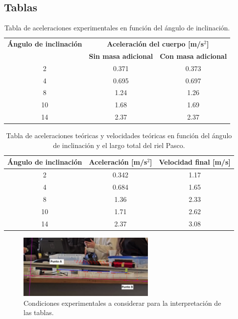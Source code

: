 \documentclass[twocolumn,12pt]{article}
\begin{document}
	

	\onecolumn
        \subsection{Tablas}
	\begin{table}[h!]
	\centering
	\begin{tabular}{|c|c|c|}
	\hline
	\textbf{Ángulo de inclinación} & \multicolumn{2}{c|}{\textbf{Aceleración del cuerpo [m/s\(^2\)]}} \\ \cline{2-3}
	\textbf{} & \textbf{Sin masa adicional} & \textbf{Con masa adicional} \\ \hline
	2\textdegree & 0.371 & 0.373 \\ \hline
	4\textdegree & 0.695 & 0.697 \\ \hline
	8\textdegree & 1.24 & 1.26 \\ \hline
	10\textdegree & 1.68 & 1.69 \\ \hline
	14\textdegree & 2.37 & 2.37 \\ \hline
	\end{tabular}
	\caption{Tabla de aceleraciones experimentales en función del ángulo de inclinación.}
	\label{tabla:aceleraciones}
	\end{table}
	
	\begin{table}[h!]
	\centering
	\begin{tabular}{|c|c|c|}
	\hline
	\textbf{Ángulo de inclinación} & \textbf{Aceleración [m/s\(^2\)]} & \textbf{Velocidad final [m/s]} \\ \hline
	2\textdegree & 0.342 & 1.17 \\ \hline
	4\textdegree & 0.684 & 1.65 \\ \hline
	8\textdegree & 1.36 & 2.33 \\ \hline
	10\textdegree & 1.71 & 2.62 \\ \hline
	14\textdegree & 2.37 & 3.08 \\ \hline
	\end{tabular}
	\caption{Tabla de aceleraciones teóricas y velocidades teóricas en función del ángulo de inclinación y el largo total del riel Pasco.}
	\label{tabla:caida_galileo}
	\end{table}

        \begin{figure}[h]
            \centering
            \includegraphics[width=0.6\textwidth]{Lab1/Multimedia/cond_exp.png}
            \caption{Condiciones experimentales a considerar para la interpretación de las tablas.}
            \label{fig:imagen}
        \end{figure}
\end{document}

